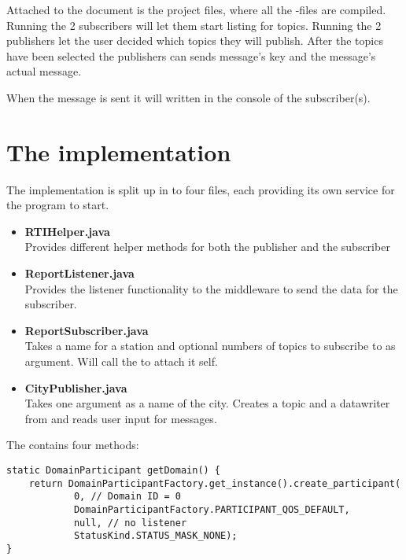 \documentclass[Main]{subfiles}
\begin{document}
Attached to the document is the project files, where all the -files are compiled.
Running the 2 subscribers will let them start listing for topics.
Running the 2 publishers let the user decided which topics they will publish.
After the topics have been selected the publishers can sends message's key and the message's actual message.

When the message is sent it will written in the console of the subscriber(s).




\section{The implementation}

The implementation is split up in to four files, each providing its own service for the program to start.

	\begin{itemize}
	\item \textbf{RTIHelper.java}
	\\
	Provides different helper methods for both the publisher and the subscriber

	\item \textbf{ReportListener.java}
	\\
	Provides the listener functionality to the middleware to send the data for the subscriber.
	
	\item \textbf{ReportSubscriber.java}
	\\
	Takes a name for a station and optional numbers of topics to subscribe to as argument. Will call the  to attach it self.
	
	\item \textbf{CityPublisher.java}
	\\
	Takes one argument as a name of the city. 
	Creates a topic and a datawriter from  and reads user input for messages.
	
	\end{itemize}

The  contains four methods:

\begin{lstlisting}[caption=RTIHelper: getDomain(), style=Code-Java, label=lst:getDomain]
static DomainParticipant getDomain() {
	return DomainParticipantFactory.get_instance().create_participant(
			0, // Domain ID = 0
			DomainParticipantFactory.PARTICIPANT_QOS_DEFAULT, 
			null, // no listener
			StatusKind.STATUS_MASK_NONE);
}
\end{lstlisting}
\end{document}
